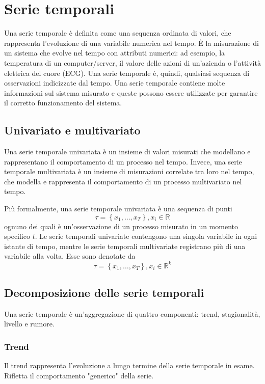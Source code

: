 \section{Serie temporali}
Una serie temporale è definita come una sequenza ordinata di valori, che rappresenta l'evoluzione di una variabile numerica nel tempo. È la misurazione di un sistema che evolve nel tempo con attributi numerici: ad esempio, la temperatura di un computer/server, il valore delle azioni di un'azienda o l'attività elettrica del cuore (ECG). Una serie temporale è, quindi, qualsiasi sequenza di osservazioni indicizzate dal tempo. Una serie temporale contiene molte informazioni sul sistema misurato e queste possono essere utilizzate per garantire il corretto funzionamento del sistema.

\subsection{Univariato e multivariato}
Una serie temporale univariata è un insieme di valori misurati che modellano e rappresentano il comportamento di un processo nel tempo. Invece, una serie temporale multivariata è un insieme di misurazioni correlate tra loro nel tempo, che modella e rappresenta il comportamento di un processo multivariato nel tempo. 

Più formalmente, una serie temporale univariata è una sequenza di punti
\[\tau = \left\{ x_1, \ldots, x_T  \right\}, x_i \in \mathbb{R}\]
ognuno dei quali è un'osservazione di un processo misurato in un momento specifico $t$. Le serie temporali univariate contengono una singola variabile in ogni istante di tempo, mentre le serie temporali multivariate registrano più di una variabile alla volta. Esse sono denotate da
\[\tau = \left\{ x_1, \ldots, x_T  \right\}, x_i \in \mathbb{R}^k \]

\subsection{Decomposizione delle serie temporali}
Una serie temporale è un'aggregazione di quattro componenti: trend, stagionalità, livello e rumore.

\subsubsection{Trend}
Il trend rappresenta l'evoluzione a lungo termine della serie temporale in esame. Rifletta il comportamento "generico" della serie.

